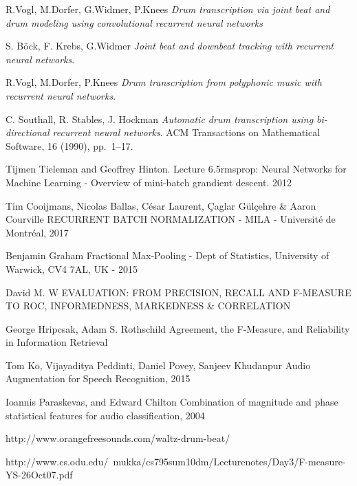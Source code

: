 \documentclass[11pt,twocolumn]{article}
\begin{document}
\begin{thebibliography}{99}

R.Vogl, M.Dorfer, G.Widmer, P.Knees
{\sl Drum transcription via joint beat and drum modeling using convolutional recurrent neural networks}

S. Böck, F. Krebs, G.Widmer
{\sl Joint beat and downbeat tracking with recurrent neural networks}.

R.Vogl, M.Dorfer, P.Knees
{\sl Drum transcription from polyphonic music with recurrent neural networks}.

C. Southall, R. Stables, J. Hockman
{\sl Automatic drum transcription using bi-directional recurrent neural networks}.
ACM Transactions on Mathematical Software, 16 (1990), pp.~1--17.

{Tijmen Tieleman and Geoffrey Hinton. Lecture 6.5rmsprop: Neural Networks for Machine Learning - Overview of mini-batch grandient descent. 2012}

Tim Cooijmans, Nicolas Ballas, César Laurent, Çaglar Gülçehre \& Aaron Courville
{RECURRENT BATCH NORMALIZATION - MILA - Université de Montréal, 2017}

Benjamin Graham
{Fractional Max-Pooling - Dept of Statistics, University of Warwick, CV4 7AL, UK - 2015 }

David M. W
{EVALUATION: FROM PRECISION, RECALL AND F-MEASURE TO ROC,
INFORMEDNESS, MARKEDNESS \& CORRELATION}

George Hripcsak, Adam S. Rothschild
{Agreement, the F-Measure, and Reliability in Information Retrieval}

Tom Ko, Vijayaditya Peddinti, Daniel Povey, Sanjeev Khudanpur
{Audio Augmentation for Speech Recognition, 2015}

Ioannis Paraskevas, and Edward Chilton
{Combination of magnitude and phase statistical features for audio classification, 2004}

{http://www.orangefreesounds.com/waltz-drum-beat/}

{http://www.cs.odu.edu/~mukka/cs795sum10dm/Lecturenotes/Day3/F-measure-YS-26Oct07.pdf}

\end{thebibliography}
\end{document}
